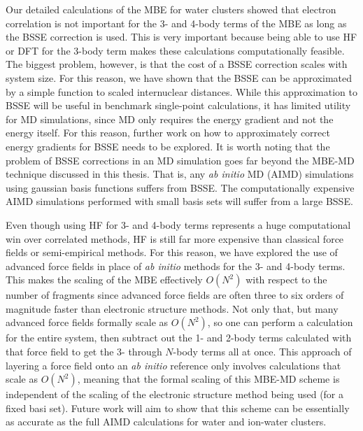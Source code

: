 \documentclass[11pt, proquest]{uwthesis}[2020/02/24]
\begin{document}
\par Our detailed calculations of the MBE for water clusters showed that electron correlation is not important for the 3- and 4-body terms of the MBE as long as the BSSE correction is used. This is very important because being able to use HF or DFT for the 3-body term makes these calculations computationally feasible. The biggest problem, however, is that the cost of a BSSE correction scales with system size. For this reason, we have shown that the BSSE can be approximated by a simple function to scaled internuclear distances. While this approximation to BSSE will be useful in benchmark single-point calculations, it has limited utility for MD simulations, since MD only requires the energy gradient and not the energy itself. For this reason, further work on how to approximately correct energy gradients for BSSE needs to be explored. It is worth noting that the problem of BSSE corrections in an MD simulation goes far beyond the MBE-MD technique discussed in this thesis. That is, any \textit{ab initio} MD (AIMD) simulations using gaussian basis functions suffers from BSSE. The computationally expensive AIMD simulations performed with small basis sets will suffer from a large BSSE.

\par Even though using HF for 3- and 4-body terms represents a huge computational win over correlated methods, HF is still far more expensive than classical force fields or semi-empirical methods. For this reason, we have explored the use of advanced force fields in place of \textit{ab initio} methods for the 3- and 4-body terms. This makes the scaling of the MBE effectively $O(N^2)$ with respect to the number of fragments since advanced force fields are often three to six orders of magnitude faster than electronic structure methods. Not only that, but many advanced force fields formally scale as $O(N^2)$, so one can perform a calculation for the entire system, then subtract out the 1- and 2-body terms calculated with that force field to get the 3- through $N$-body terms all at once. This approach of layering a force field onto an \textit{ab initio} reference only involves calculations that scale as $O(N^2)$, meaning that the formal scaling of this MBE-MD scheme is independent of the scaling of the electronic structure method being used (for a fixed basi set). Future work will aim to show that this scheme can be essentially as accurate as the full AIMD calculations for water and ion-water clusters.
\end{document}
